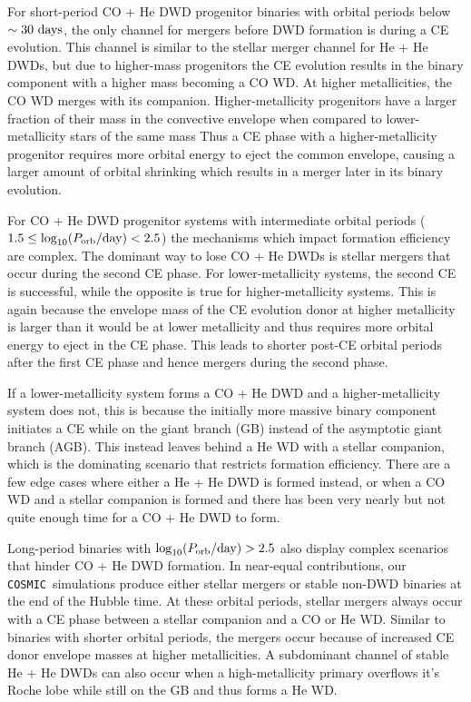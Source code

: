 \documentclass[twocolumn, linenumbers]{aastex631}
\newcommand{\cosmic}{\texttt{COSMIC}}
\begin{document}
For short-period CO + He DWD progenitor binaries with orbital periods below $\sim30~\rm{days}$, the only channel for mergers before DWD formation is during a CE evolution. This channel is similar to the stellar merger channel for He + He DWDs, but due to higher-mass progenitors the CE evolution results in the binary component with a higher mass becoming a CO WD. At higher metallicities, the CO WD merges with its companion. Higher-metallicity progenitors have a larger fraction of their mass in the convective envelope when compared to lower-metallicity stars of the same mass \citep{Amard2019, Amard2020} Thus a CE phase with a higher-metallicity progenitor requires more orbital energy to eject the common envelope, causing a larger amount of orbital shrinking which results in a merger later in its binary evolution.

For CO + He DWD progenitor systems with intermediate orbital periods ($1.5\leq \log_{10}(P_{\rm{orb}}/\rm{day})< 2.5$) the mechanisms which impact formation efficiency are complex. The dominant way to lose CO + He DWDs is stellar mergers that occur during the second CE phase. For lower-metallicity systems, the second CE is successful, while the opposite is true for higher-metallicity systems. This is again because the envelope mass of the CE evolution donor at higher metallicity is larger than it would be at lower metallicity and thus requires more orbital energy to eject in the CE phase. This leads to shorter post-CE orbital periods after the first CE phase and hence mergers during the second phase.

If a lower-metallicity system forms a CO + He DWD and a higher-metallicity system does not, this is because the initially more massive binary component initiates a CE while on the giant branch (GB) instead of the asymptotic giant branch (AGB). This instead leaves behind a He WD with a stellar companion, which is the dominating scenario that restricts formation efficiency. There are a few edge cases where either a He + He DWD is formed instead, or when a CO WD and a stellar companion is formed and there has been very nearly but not quite enough time for a CO + He DWD to form. 

Long-period binaries with $\log_{10}(P_{\rm{orb}}/\rm{day})>2.5$ also display complex scenarios that hinder CO + He DWD formation. In near-equal contributions, our \cosmic\ simulations produce either stellar mergers or stable non-DWD binaries at the end of the Hubble time. At these orbital periods, stellar mergers always occur with a CE phase between a stellar companion and a CO or He WD. Similar to binaries with shorter orbital periods, the mergers occur because of increased CE donor envelope masses at higher metallicities. A subdominant channel of stable He + He DWDs can also occur when a high-metallicity primary overflows it's Roche lobe while still on the GB and thus forms a He WD.
\end{document}
